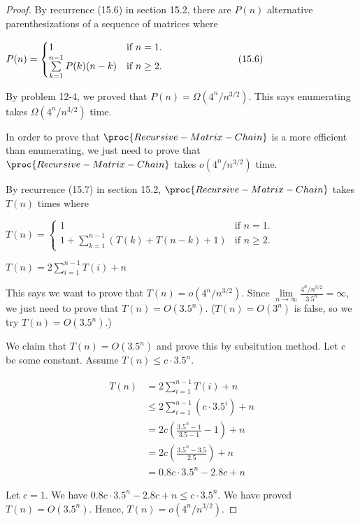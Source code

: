 \begin{proof}
    \noindent
    By recurrence (15.6) in section 15.2, 
    there are $P(n)$ alternative parenthesizations of a sequence of matrices
    where

    $P(n)=
    \begin{cases}
        1 & \text{if $n = 1$.} \\
        \sum\limits_{k=1}^{n-1}P(k)(n-k) & \text{if $n \geq 2$.}
    \end{cases}
    \indent\indent\indent\indent\indent
    (15.6)$

    \noindent
    By problem 12-4, we proved that $P(n) = \Omega(4^n/n^{3/2})$.
    This says enumerating takes $\Omega(4^n/n^{3/2})$ time.

    \noindent
    In order to prove that 
    $\proc{Recursive-Matrix-Chain}$ is a more efficient than enumerating,
    we just need to prove that 
    $\proc{Recursive-Matrix-Chain}$ takes $o(4^n/n^{3/2})$ time.

    \noindent
    By recurrence (15.7) in section 15.2, 
    $\proc{Recursive-Matrix-Chain}$ takes $T(n)$ times
    where 

    $T(n)=
    \begin{cases}
        1 & \text{if $n = 1$.} \\
        1 + \sum\limits_{k=1}^{n-1}(T(k) + T(n-k) + 1) & \text{if $n \geq 2$.}
    \end{cases}$

    $T(n)=2\sum\limits_{i=1}^{n-1}T(i)+n$

    \noindent
    This says we want to prove that $T(n) = o(4^n/n^{3/2})$.
    Since $\lim\limits_{n\rightarrow\infty}\frac{4^n/n^{3/2}}{3.5^n}=\infty$,
    we just need to prove that $T(n) = O(3.5^n)$.
    ($T(n) = O(3^n)$ is false, so we try $T(n) = O(3.5^n)$.)

    \noindent
    We claim that $T(n) = O(3.5^n)$ and prove this by subsitution method.
    Let $c$ be some constant. Assume $T(n) \leq c \cdot 3.5^n$.

    \begin{equation*}
    \begin{split}
        T(n) &= 2 \sum\limits_{i=1}^{n-1} T(i) + n \\
        &\leq 2 \sum\limits_{i=1}^{n-1} (c \cdot 3.5^i) + n \\
        &= 2c (\frac{3.5^n - 1}{3.5 - 1} - 1) + n \\
        &= 2c (\frac{3.5^n - 3.5}{2.5}) + n \\
        &= 0.8c \cdot 3.5^n - 2.8c + n
    \end{split}
    \end{equation*}

    \noindent
    Let $c = 1$.
    We have 
    $0.8c \cdot 3.5^n - 2.8c + n \leq c \cdot 3.5^n$.
    We have proved $T(n) = O(3.5^n)$.
    Hence, $T(n) = o(4^n/n^{3/2})$.
\end{proof}

